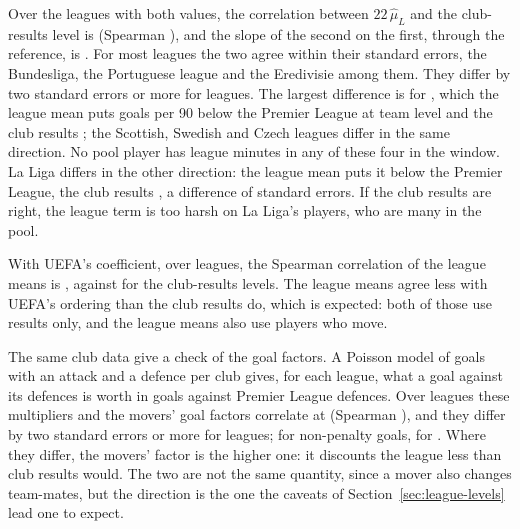 \documentclass[11pt,a4paper]{article}
\begin{document}
Over the \ValNLeaguesClub{} leagues with both values, the correlation between
$22\,\hat\mu_L$ and the club-results level is \ValPearsonClub{} (Spearman
\ValSpearmanClub{}), and the slope of the second on the first, through the
reference, is \ValSlopeClub{}. For most leagues the two agree within their
standard errors, the Bundesliga, the Portuguese league and the Eredivisie among
them. They differ by two standard errors or more for \ValNTwoSeClub{} leagues.
The largest difference is for \ValMaxGapLeague{}, which the league mean puts
\ValMaxGapRapm{} goals per 90 below the Premier League at team level and the
club results \ValMaxGapClub{}; the Scottish, Swedish and Czech leagues differ
in the same direction. No pool player has league minutes in any of these four
in the window. La Liga differs in the other direction: the league mean puts it
\ValGapSpainRapm{} below the Premier League, the club results
\ValGapSpainClub{}, a difference of \LeagueClubSpainGapZ{} standard errors. If
the club results are right, the league term is too harsh on La Liga's players,
who are many in the pool.

With UEFA's coefficient, over \ValNLeaguesUefa{} leagues, the Spearman
correlation of the league means is \ValSpearmanUefa{}, against
\ValSpearmanClubUefa{} for the club-results levels. The league means agree
less with UEFA's ordering than the club results do, which is expected: both of
those use results only, and the league means also use players who move.

The same club data give a check of the goal factors. A Poisson model of goals
with an attack and a defence per club gives, for each league, what a goal
against its defences is worth in goals against Premier League defences. Over
\ValNFactorGoals{} leagues these multipliers and the movers' goal factors
correlate at \ValPearsonFactorGoals{} (Spearman \ValSpearmanFactorGoals{}), and
they differ by two standard errors or more for \ValNTwoSeFactorGoals{} leagues;
for non-penalty goals, for \ValNTwoSeFactorNpGoals{}. Where they differ, the
movers' factor is the higher one: it discounts the league less than club
results would. The two are not the same quantity, since a mover also changes
team-mates, but the direction is the one the caveats of
Section~\ref{sec:league-levels} lead one to expect.
\end{document}
